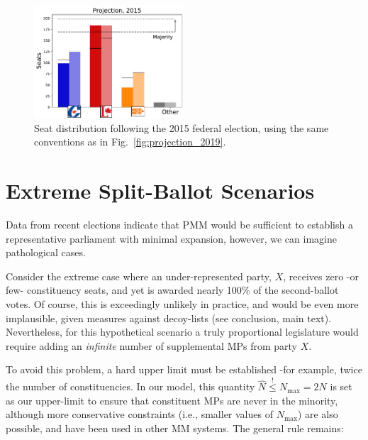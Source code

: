 \begin{figure}[h!]
  \includegraphics[width=0.50\textwidth,clip]{PR_calcs/data/raw_2015/PMM_out/PMM_projections}
  \caption{ Seat distribution following the 2015 federal election, using the same conventions as in Fig.~\ref{fig:projection_2019}.}
\label{fig:projection_2015}
\end{figure}



\section{Extreme Split-Ballot Scenarios}

Data from recent elections indicate that PMM would be sufficient to establish a representative parliament with minimal expansion, however, we can imagine pathological cases. 

Consider the extreme case where an under-represented party, $X$, receives zero \--or few\-- constituency seats, and yet is awarded nearly 100\% of the second-ballot votes.
Of course, this is exceedingly unlikely in practice, and would be even more implausible, given measures against decoy-lists (see conclusion, main text).
Nevertheless, for this hypothetical scenario a truly proportional legislature would require adding an \emph{infinite} number of supplemental MPs from party \textbf{$X$}.

To avoid this problem, a hard upper limit must be established \--for example, twice the number of constituencies. In our model, this quantity $\hat N \stackrel{!}{\le} N_{\textrm{max}} = 2 N$ is set as our upper-limit to ensure that constituent MPs are never in the minority, although more conservative constraints (i.e., smaller values of $N_{\textrm{max}}$) are also possible, and have been used in other MM systems. 
The general rule remains:


